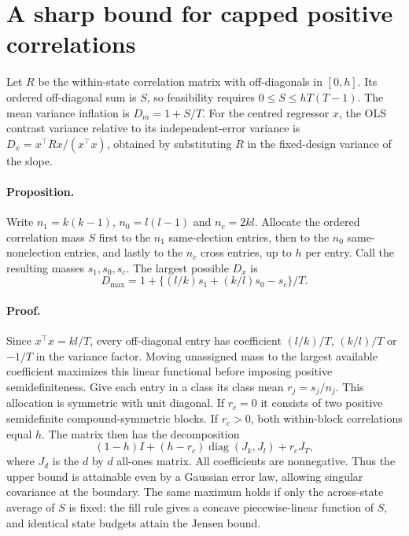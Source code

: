 \documentclass[11pt]{article}
\begin{document}
\section{A sharp bound for capped positive correlations}
Let $R$ be the within-state correlation matrix with off-diagonals in $[0,h]$. Its ordered off-diagonal sum is $S$, so feasibility requires $0\le S\le hT(T-1)$. The mean variance inflation is $D_m=1+S/T$. For the centred regressor $x$, the OLS contrast variance relative to its independent-error variance is $D_x=x^\top R x/(x^\top x)$, obtained by substituting $R$ in the fixed-design variance of the slope.

\paragraph{Proposition.} Write $n_1=k(k-1)$, $n_0=l(l-1)$ and $n_c=2kl$. Allocate the ordered correlation mass $S$ first to the $n_1$ same-election entries, then to the $n_0$ same-nonelection entries, and lastly to the $n_c$ cross entries, up to $h$ per entry. Call the resulting masses $s_1,s_0,s_c$. The largest possible $D_x$ is
\[
  D_{\max}=1+\{(l/k)s_1+(k/l)s_0-s_c\}/T .
\]

\paragraph{Proof.} Since $x^\top x=kl/T$, every off-diagonal entry has coefficient $(l/k)/T$, $(k/l)/T$ or $-1/T$ in the variance factor. Moving unassigned mass to the largest available coefficient maximizes this linear functional before imposing positive semidefiniteness. Give each entry in a class its class mean $r_j=s_j/n_j$. This allocation is symmetric with unit diagonal. If $r_c=0$ it consists of two positive semidefinite compound-symmetric blocks. If $r_c>0$, both within-block correlations equal $h$. The matrix then has the decomposition
\[
 (1-h)I+(h-r_c)\operatorname{diag}(J_k,J_l)+r_cJ_T ,
\]
where $J_d$ is the $d$ by $d$ all-ones matrix. All coefficients are nonnegative. Thus the upper bound is attainable even by a Gaussian error law, allowing singular covariance at the boundary. The same maximum holds if only the across-state average of $S$ is fixed: the fill rule gives a concave piecewise-linear function of $S$, and identical state budgets attain the Jensen bound.
\end{document}
